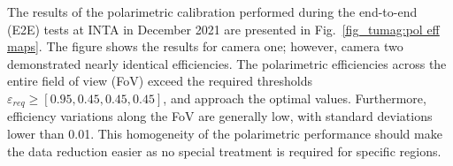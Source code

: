 The results of the polarimetric calibration performed during the end-to-end (E2E) tests at INTA in December 2021 are presented in Fig.~\ref{fig_tumag:pol eff maps}. The figure shows the results for camera one; however, camera two demonstrated nearly identical efficiencies. The polarimetric efficiencies across the entire field of view (FoV) exceed the required thresholds $\varepsilon _{req} \geqslant [0.95, 0.45, 0.45, 0.45]$, and approach the optimal values. Furthermore, efficiency variations along the FoV are generally low, with standard deviations lower than 0.01. This homogeneity of the polarimetric performance should make the data reduction easier as no special treatment is required for specific regions.  